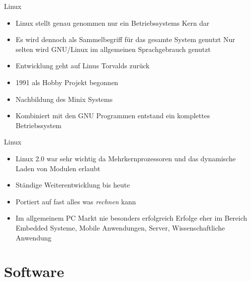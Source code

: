 \documentclass[aspectratio=43]{beamer}
\begin{document}
\begin{frame} 

	\begin{block}{Linux} 
	\begin{itemize}
	\item Linux stellt genau genommen nur ein Betriebssystems Kern dar
	\item Es wird dennoch als Sammelbegriff für das gesamte System genutzt
	\newline Nur selten wird GNU/Linux im allgemeinen Sprachgebrauch genutzt
	\item Entwicklung geht auf Linus Torvalds zurück
	\item 1991 als Hobby Projekt begonnen
	\item Nachbildung des Minix Systems
	\item Kombiniert mit den GNU Programmen entstand ein komplettes Betriebssystem 
	\end{itemize}
	\end{block}

\end{frame}

\begin{frame} 

	\begin{block}{Linux} 
	\begin{itemize}
	\item Linux 2.0 war sehr wichtig da Mehrkernprozessoren und das dynamische Laden von Modulen erlaubt
	\item Ständige Weiterentwicklung bis heute
	\item Portiert auf fast alles was \textit{rechnen} kann
	\item Im allgemeinem PC Markt nie besonders erfolgreich
	\newline Erfolge eher im Bereich Embedded Systeme, Mobile Anwendungen, Server, Wissenschaftliche Anwendung
	\end{itemize}
	\end{block}

\end{frame}

\section{Software}
\end{document}
